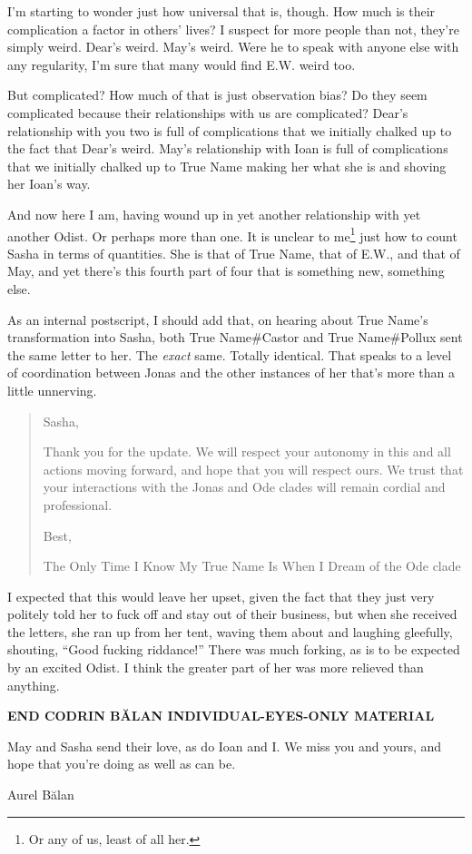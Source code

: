 I'm starting to wonder just how universal that is, though. How much is their complication a factor in others' lives? I suspect for more people than not, they're simply weird. Dear's weird. May's weird. Were he to speak with anyone else with any regularity, I'm sure that many would find E.W. weird too.

But complicated? How much of that is just observation bias? Do they seem complicated because their relationships with us are complicated? Dear's relationship with you two is full of complications that we initially chalked up to the fact that Dear's weird. May's relationship with Ioan is full of complications that we initially chalked up to True Name making her what she is and shoving her Ioan's way.

And now here I am, having wound up in yet another relationship with yet another Odist. Or perhaps more than one. It is unclear to me\footnote{Or any of us, least of all her.} just how to count Sasha in terms of quantities. She is that of True Name, that of E.W., and that of May, and yet there's this fourth part of four that is something new, something else.

As an internal postscript, I should add that, on hearing about True Name's transformation into Sasha, both True Name\#Castor and True Name\#Pollux sent the same letter to her. The \emph{exact} same. Totally identical. That speaks to a level of coordination between Jonas and the other instances of her that's more than a little unnerving.

\begin{quote}
Sasha,

Thank you for the update. We will respect your autonomy in this and all actions moving forward, and hope that you will respect ours. We trust that your interactions with the Jonas and Ode clades will remain cordial and professional.

Best,

The Only Time I Know My True Name Is When I Dream of the Ode clade
\end{quote}

I expected that this would leave her upset, given the fact that they just very politely told her to fuck off and stay out of their business, but when she received the letters, she ran up from her tent, waving them about and laughing gleefully, shouting, ``Good fucking riddance!'' There was much forking, as is to be expected by an excited Odist. I think the greater part of her was more relieved than anything.

\begin{center}
\textbf{END CODRIN BĂLAN INDIVIDUAL-EYES-ONLY MATERIAL}
\end{center}

May and Sasha send their love, as do Ioan and I. We miss you and yours, and hope that you're doing as well as can be.

Aurel Bălan
